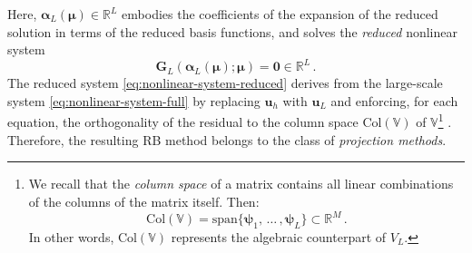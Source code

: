 \documentclass[12pt, a4paper, twoside, openright]{report}
\numberwithin{equation}{chapter}
\theoremstyle{theorem}
\theoremstyle{definition}
\theoremstyle{remark}
\theoremstyle{proposition}
\numberwithin{figure}{chapter}
\begin{document}
		Here, $\boldsymbol{\alpha}_L(\boldsymbol{\mu}) \in \mathbb{R}^L$ embodies the coefficients of the expansion of the reduced solution in terms of the reduced basis functions, and solves the \emph{reduced} nonlinear system
		\begin{equation}
			\label{eq:nonlinear-system-reduced}
			\boldsymbol{G}_L(\boldsymbol{\alpha}_L(\boldsymbol{\mu}); \boldsymbol{\mu}) = \boldsymbol{0} \in \mathbb{R}^L \, .
		\end{equation}
		The reduced system \eqref{eq:nonlinear-system-reduced} derives from the large-scale system \eqref{eq:nonlinear-system-full} by replacing $\mathbf{u}_h$ with $\mathbf{u}_L$ and enforcing, for each equation, the orthogonality of the residual to the column space $\text{Col}(\mathbb{V})$ of $\mathbb{V}$\footnote{We recall that the \emph{column space} of a matrix contains all linear combinations of the columns of the matrix itself. Then: \begin{equation*} \text{Col}(\mathbb{V}) = \text{span} \big\lbrace \boldsymbol{\psi}_1, \, \ldots \, , \boldsymbol{\psi}_L \big\rbrace \subset \mathbb{R}^M \, . \end{equation*} In other words, $\text{Col}(\mathbb{V})$ represents the algebraic counterpart of $V_L$.} \cite{MN16}. Therefore, the resulting RB method belongs to the class of \emph{projection methods}. 
		
\end{document}
